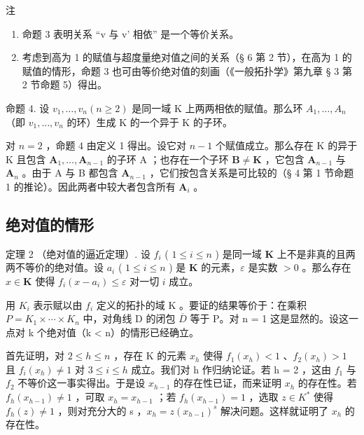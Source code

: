 注

\begin{enumerate}
\def\labelenumi{(\arabic{enumi})}
\item
  命题 3 表明关系 ``v 与 v' 相依'' 是一个等价关系。
\item
  考虑到高为 1 的赋值与超度量绝对值之间的关系（§ 6 第 2 节），在高为 1 的赋值的情形，命题 3 也可由等价绝对值的刻画（《一般拓扑学》第九章 § 3 第 2 节命题 5）得出。
\end{enumerate}

命题 4. 设 \(v_{1}, \ldots, v_{n} (n \geqslant 2)\) 是同一域 K 上两两相依的赋值。那么环 \(A_{1}, \ldots, A_{n}\) （即 \(v_{1}, \ldots, v_{n}\) 的环）生成 K 的一个异于 K 的子环。

对 \(n = 2\) ，命题 4 由定义 1 得出。设它对 \(n - 1\) 个赋值成立。那么存在 K 的异于 K 且包含 \(\mathbf{A}_1, \ldots, \mathbf{A}_{n-1}\) 的子环 A ；也存在一个子环 \(\mathbf{B} \neq \mathbf{K}\) ，它包含 \(\mathbf{A}_{n-1}\) 与 \(\mathbf{A}_n\) 。由于 A 与 B 都包含 \(\mathbf{A}_{n-1}\) ，它们按包含关系是可比较的（§ 4 第 1 节命题 1 的推论）。因此两者中较大者包含所有 \(\mathbf{A}_i\) 。

\subsection{绝对值的情形}

定理 2 （绝对值的逼近定理）. 设 \(f_{i}\) ( \(1 \leqslant i \leqslant n\) ) 是同一域 \(\mathbf{K}\) 上不是非真的且两两不等价的绝对值。设 \(a_{i}\) ( \(1 \leqslant i \leqslant n\) ) 是 \(\mathbf{K}\) 的元素，\(\varepsilon\) 是实数 \(>0\) 。那么存在 \(x \in \mathbf{K}\) 使得 \(f_{i}(x - a_{i}) \leqslant \varepsilon\) 对一切 \(i\) 成立。

用 \(K_{i}\) 表示赋以由 \(f_{i}\) 定义的拓扑的域 K 。要证的结果等价于：在乘积 \(P = K_{1} \times \cdots \times K_{n}\) 中，对角线 D 的闭包 \(\overline{D}\) 等于 P。对 n = 1 这是显然的。设这一点对 k 个绝对值（k < n）的情形已经确立。

首先证明，对 \(2 \leqslant h \leqslant n\) ，存在 K 的元素 \(x_{h}\) 使得 \(f_{1}(x_{h}) < 1\) 、\(f_{2}(x_{h}) > 1\) 且 \(f_{i}(x_{h}) \neq 1\) 对 \(3 \leqslant i \leqslant h\) 成立。我们对 h 作归纳论证。若 h = 2 ，这由 \(f_{1}\) 与 \(f_{2}\) 不等价这一事实得出。于是设 \(x_{h-1}\) 的存在性已证，而来证明 \(x_{h}\) 的存在性。若 \(f_{h}(x_{h-1}) \neq 1\) ，可取 \(x_{h} = x_{h-1}\) ；若 \(f_{h}(x_{h-1}) = 1\) ，选取 \(z \in K^{*}\) 使得 \(f_{h}(z) \neq 1\) ，则对充分大的 s ，\(x_{h} = z(x_{h-1})^{s}\) 解决问题。这样就证明了 \(x_{h}\) 的存在性。

